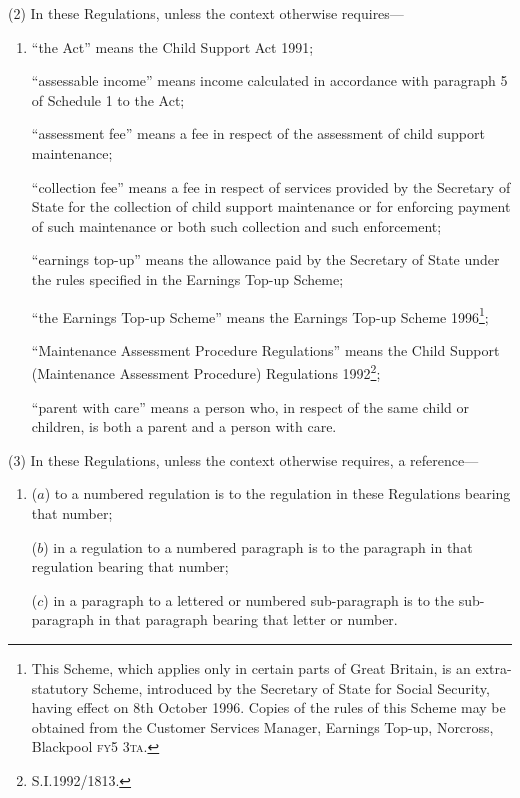 \documentclass[a4paper]{article}
\begin{document}
(2) In these Regulations, unless the context otherwise requires—
\begin{enumerate}\item[]
“the Act” means the Child Support Act 1991;

“assessable income” means income calculated in accordance with paragraph 5 of Schedule 1 to the Act;

“assessment fee” means a fee in respect of the assessment of child support maintenance;


“collection fee” means a fee in respect of services provided by the Secretary of State for the collection of child support maintenance or for enforcing payment of such maintenance or both such collection and such enforcement;

“earnings top-up” means the allowance paid by the Secretary of State under the rules specified in the Earnings Top-up Scheme;

“the Earnings Top-up Scheme” means the Earnings Top-up Scheme 1996\footnote{\frenchspacing This Scheme, which applies only in certain parts of Great Britain, is an extra-statutory Scheme, introduced by the Secretary of State for Social Security, having effect on 8th October 1996. Copies of the rules of this Scheme may be obtained from the Customer Services Manager, Earnings Top-up, Norcross, Blackpool \textsc{fy5 3ta}.};

“Maintenance Assessment Procedure Regulations” means the Child Support (Maintenance Assessment Procedure) Regulations 1992\footnote{\frenchspacing S.I.1992/1813.};

“parent with care” means a person who, in respect of the same child or children, is both a parent and a person with care.
\end{enumerate}

(3) In these Regulations, unless the context otherwise requires, a reference—
\begin{enumerate}\item[]
($a$) to a numbered regulation is to the regulation in these Regulations bearing that number;

($b$) in a regulation to a numbered paragraph is to the paragraph in that regulation bearing that number;

($c$) in a paragraph to a lettered or numbered sub-paragraph is to the sub-paragraph in that paragraph bearing that letter or number.
\end{enumerate}
\end{document}

